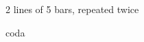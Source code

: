 \documentclass[11pt]{article}
\begin{document}
\def\NumberOfBarsPerLine{5}

\begin{chordbar}[2]{10}{2 lines of 5 bars, repeated twice}
\newchordline
{}
\repeatBar
\end{chordbar}


\def\NumberOfBarsPerLine{8}
\begin{chordbar}[2]{6}{coda}
\end{chordbar}


\printNbBars
\end{document}
